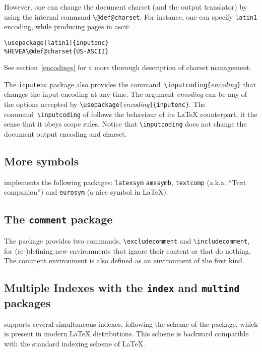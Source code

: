 However, one can change the document charset (and the output
translator) by using the internal command \verb+\@def@charset+.
For instance, one can specify \texttt{latin1} encoding, while
producing \html{} pages in ascii:
\begin{verbatim}
\usepackage[latin1]{inputenc}
%HEVEA\@def@charset{US-ASCII}
\end{verbatim}
See section~\ref{encodings} for a more thorough description of \html{}
charset management.

The \texttt{inputenc} package also provides the
command~\verb+\inputcoding{+\textit{encoding}\verb+}+ that
changes the input encoding at any time.
The argument \textit{encoding} can be any of the options accepted
by \verb+\usepackage[+\textit{encoding}\verb+]{inputenc}+.
The command~\verb+\inputcoding+ of \hevea{}
follows the behaviour of its \LaTeX{} counterpart, it the sense
that it obeys scope rules.
Notice that \verb+\inputcoding+ does not change the document output
encoding and charset.

\subsection{More symbols}
\hevea{} implements the following packages: \texttt{latexsym}
\texttt{amssymb}, \texttt{textcomp} (a.k.a. ``Text companion'')
and \texttt{eurosym} (a nice \texteuro{} symbol in \LaTeX).


\subsection{The \texttt{comment}\label{commentpack} package}
%
The  package provides two commands,
\verb+\excludecomment+ and \verb+\includecomment+, for (re-)defining
new environments that ignore their content or that do nothing. The
comment environment is also defined as an environment of the first
kind.



\subsection{Multiple Indexes with the \texttt{index} and
\texttt{multind}\label{multind} packages}
%
\hevea{} supports several simultaneous indexes, following the scheme
of the
 package,
which is present in modern \LaTeX{} distributions.
This scheme is backward compatible with the standard indexing scheme
of \LaTeX.

